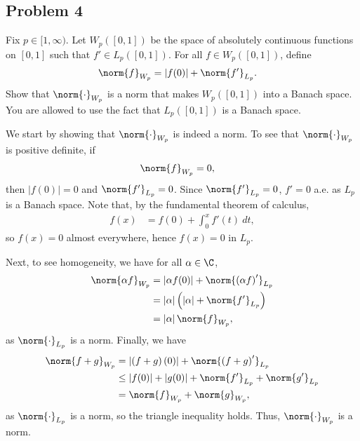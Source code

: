 \documentclass[10pt]{mypackage}
\begin{document}
\subsection{Problem 4}%
\begin{problem}
  Fix $p\in [1,\infty)$. Let $W_{p}\left( [0,1] \right)$ be the space of absolutely continuous functions on $[0,1]$ such that $f'\in L_p\left( [0,1] \right)$. For all $f\in W_p\left( [0,1] \right)$, define
  \begin{align*}
    \norm{f}_{W_p} &= \left\vert f(0) \right\vert + \norm{f'}_{L_p}.
  \end{align*}
  Show that $\norm{\cdot}_{W_p}$ is a norm that makes $W_p\left( [0,1] \right)$ into a Banach space. You are allowed to use the fact that $L_p\left( [0,1] \right)$ is a Banach space.
\end{problem}
We start by showing that $\norm{\cdot}_{W_p}$ is indeed a norm. To see that $\norm{\cdot}_{W_p}$ is positive definite, if
\begin{align*}
  \norm{f}_{W_p} &= 0,
\end{align*}
then $\left\vert f(0) \right\vert = 0$ and $\norm{f'}_{L_p} = 0$. Since $\norm{f'}_{L_p} = 0$, $f' = 0$ a.e. as $L_p$ is a Banach space. Note that, by the fundamental theorem of calculus,
\begin{align*}
  f(x) &= f(0) + \int_{0}^{x} f'(t)\:dt,
\end{align*}
so $f(x) = 0$ almost everywhere, hence $f(x) = 0$ in $L_p$.\newline

Next, to see homogeneity, we have for all $\alpha\in\C$,
\begin{align*}
  \norm{\alpha f}_{W_p} &= \left\vert \alpha f(0) \right\vert + \norm{\left( \alpha f \right)'}_{L_p}\\
                        &= \left\vert \alpha \right\vert\left( \left\vert \alpha \right\vert + \norm{f'}_{L_p} \right)\\
                        &= \left\vert \alpha \right\vert\norm{f}_{W_p},
\end{align*}
as $\norm{\cdot}_{L_p}$ is a norm. Finally, we have
\begin{align*}
  \norm{f + g}_{W_p} &= \left\vert \left( f+g \right)(0) \right\vert + \norm{\left( f+g \right)'}_{L_p}\\
                     &\leq \left\vert f(0) \right\vert + \left\vert g(0) \right\vert + \norm{f'}_{L_p} + \norm{g'}_{L_p}\\
                     &= \norm{f}_{W_p} + \norm{g}_{W_p},
\end{align*}
as $\norm{\cdot}_{L_p}$ is a norm, so the triangle inequality holds. Thus, $\norm{\cdot}_{W_p}$ is a norm.\newline
\end{document}
